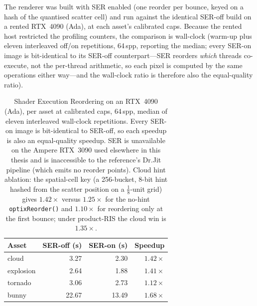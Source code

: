 The renderer was built with SER enabled (one reorder per bounce, keyed on a hash of the quantised scatter
cell) and run against the identical SER-off build on a rented RTX~4090 (Ada), at each asset's calibrated
caps. Because the rented host restricted the profiling counters, the comparison is wall-clock (warm-up
plus eleven interleaved off/on repetitions, \num{64}\,spp, reporting the median; every SER-on image is
bit-identical to its SER-off counterpart---SER reorders \emph{which} threads co-execute, not the
per-thread arithmetic, so each pixel is computed by the same operations either way---and the wall-clock
ratio is therefore also the equal-quality ratio).

\begin{table}[htp]
  \centering
  \begin{tabular}{@{}lrrr@{}}
    \toprule
    Asset & SER-off (s) & SER-on (s) & Speedup \\
    \midrule
    cloud     & 3.27  & 2.30  & $1.42\times$ \\
    explosion & 2.64  & 1.88  & $1.41\times$ \\
    tornado   & 3.06  & 2.73  & $1.12\times$ \\
    bunny     & 22.67 & 13.49 & $\mathbf{1.68\times}$ \\
    \bottomrule
  \end{tabular}
  \caption{Shader Execution Reordering on an RTX~4090 (Ada), per asset at calibrated caps, \num{64}\,spp,
  median of eleven interleaved wall-clock repetitions. Every SER-on image is bit-identical to SER-off, so
  each speedup is also an equal-quality speedup. SER is unavailable on the Ampere RTX~3090 used elsewhere
  in this thesis and is inaccessible to the reference's Dr.Jit pipeline (which emits no reorder points).
  Cloud hint ablation: the spatial-cell key (a \num{256}-bucket, \num{8}-bit hint hashed from the scatter
  position on a $\tfrac{1}{8}$-unit grid) gives $1.42\times$ versus $1.25\times$ for the
  no-hint \texttt{optixReorder()} and $1.10\times$ for reordering only at the first bounce; under
  product-RIS the cloud win is $1.35\times$.}
  \label{tab:ser}
\end{table}

